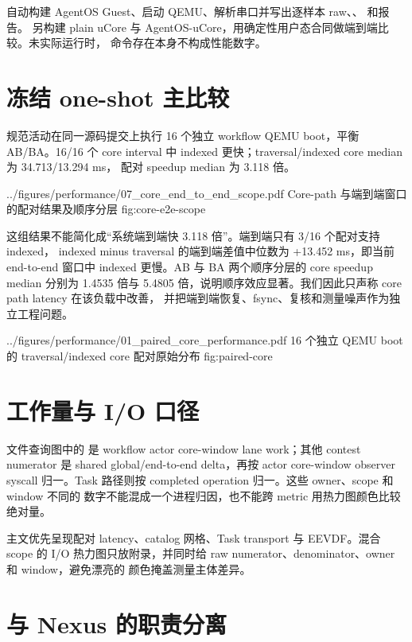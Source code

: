 自动构建 AgentOS Guest、启动 QEMU、解析串口并写出逐样本
raw、、 和报告。
另构建 plain uCore 与 AgentOS-uCore，用确定性用户态合同做端到端比较。未实际运行时，
命令存在本身不构成性能数字。

\section{冻结 one-shot 主比较}

规范活动在同一源码提交上执行 16 个独立 workflow QEMU boot，平衡 AB/BA。16/16 个
core interval 中 indexed 更快；traversal/indexed core median 为 34.713/13.294 ms，
配对 speedup median 为 3.118 倍。

  {../figures/performance/07_core_end_to_end_scope.pdf}
  {Core-path 与端到端窗口的配对结果及顺序分层}
  {fig:core-e2e-scope}

这组结果不能简化成“系统端到端快 3.118 倍”。端到端只有 3/16 个配对支持 indexed，
indexed minus traversal 的端到端差值中位数为 +13.452 ms，即当前 end-to-end 窗口中
indexed 更慢。AB 与 BA 两个顺序分层的 core speedup median 分别为 1.4535 倍与
5.4805 倍，说明顺序效应显著。我们因此只声称 core path latency 在该负载中改善，
并把端到端恢复、fsync、复核和测量噪声作为独立工程问题。

  {../figures/performance/01_paired_core_performance.pdf}
  {16 个独立 QEMU boot 的 traversal/indexed core 配对原始分布}
  {fig:paired-core}

\section{工作量与 I/O 口径}

文件查询图中的  是 workflow actor core-window lane work；其他 contest
numerator 是 shared global/end-to-end delta，再按 actor core-window observer syscall
归一。Task 路径则按 completed operation 归一。这些 owner、scope 和 window 不同的
数字不能混成一个进程归因，也不能跨 metric 用热力图颜色比较绝对量。

主文优先呈现配对 latency、catalog 网格、Task transport 与 EEVDF。混合 scope 的 I/O
热力图只放附录，并同时给 raw numerator、denominator、owner 和 window，避免漂亮的
颜色掩盖测量主体差异。

\section{与 Nexus 的职责分离}

